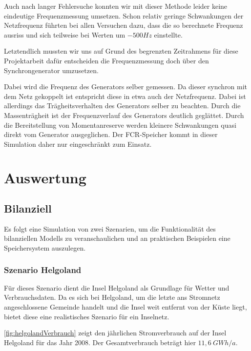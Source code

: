 Auch nach langer Fehlersuche konnten wir mit dieser Methode leider keine eindeutige Frequenzmessung umsetzen.
Schon relativ geringe Schwankungen der Netzfrequenz führten bei allen Versuchen dazu, dass die so berechnete Frequenz
ausriss und sich teilweise bei Werten um $-500 Hz$ einstellte.

Letztendlich mussten wir uns auf Grund des begrenzten Zeitrahmens für diese Projektarbeit dafür entscheiden die Frequenzmessung
doch über den Synchrongenerator umzusetzen.

Dabei wird die Frequenz des Generators selber gemessen.
Da dieser synchron mit dem Netz gekoppelt ist entspricht diese in etwa auch der Netzfrequenz.
Dabei ist allerdings das Trägheitsverhalten des Generators selber zu beachten.
Durch die Massenträgheit ist der Frequenzverlauf des Generators deutlich geglättet.
Durch die Bereitstellung von Momentanreserve werden kleinere Schwankungen quasi direkt vom Generator ausgeglichen.
Der FCR-Speicher kommt in dieser Simulation daher nur eingeschränkt zum Einsatz.



\chapter{Auswertung}

\section{Bilanziell}

Es folgt eine Simulation von zwei Szenarien, um die Funktionalität des bilanziellen Modells zu veranschaulichen und an praktischen Beispielen eine Speichersystem auszulegen.

\subsection{Szenario Helgoland}

Für dieses Szenario dient die Insel Helgoland als Grundlage für Wetter und Verbrauchsdaten. Da es sich bei Helgoland, um die letzte ans Stromnetz angeschlossene Gemeinde handelt und die Insel weit entfernt von der Küste liegt, bietet diese eine realistisches Szenario für ein Inselnetz.

\autoref{fig:helgolandVerbrauch} zeigt den jährlichen Stromverbrauch auf der Insel Helgoland für das Jahr 2008. Der Gesamtverbrauch beträgt hier $11,6~GWh/a$.

